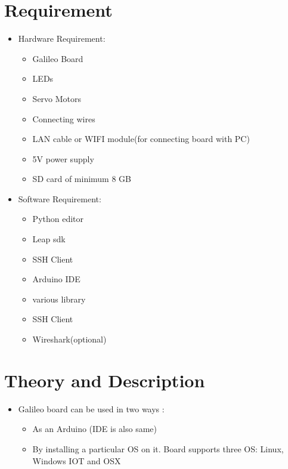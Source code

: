 \documentclass[11pt,a4paper]{article}
\newcommand\tab[1][1cm]{\hspace*{#1}}
\begin{document}
    \section{Requirement}
	\vspace{1cm}
	\begin{itemize}
	    \item Hardware Requirement:
	    \begin{itemize}
	        \item Galileo Board
	        \item LEDs
	        \item Servo Motors
	        \item Connecting wires
	        \item LAN cable or WIFI module(for connecting board with PC)
	        \item 5V power supply
            \item SD card of minimum 8 GB
	    \end{itemize}
	    \vspace{1cm}

	    \item Software Requirement:
	    \begin{itemize}
	        \item Python editor
	        \item Leap sdk
	        \item SSH Client
            \item Arduino IDE
	        \item various library
	        \item SSH Client
	        \item Wireshark(optional)
	    \end{itemize}
	\end{itemize}
	\newpage
    \section{Theory and Description}
	\vspace{.3cm}
    \begin{itemize}
		\item Galileo board can be used in two ways :
        \begin{itemize}
			\item As an Arduino (IDE is also same)
            \item By installing a particular OS on it. 
Board supports three OS: Linux, Windows IOT and OSX
\end{itemize}
	\end{itemize}
    \tab{IOT feature is also available for both modes. This implies that the board can be connected to the Internet without installing any OS.}
    
\end{document}
